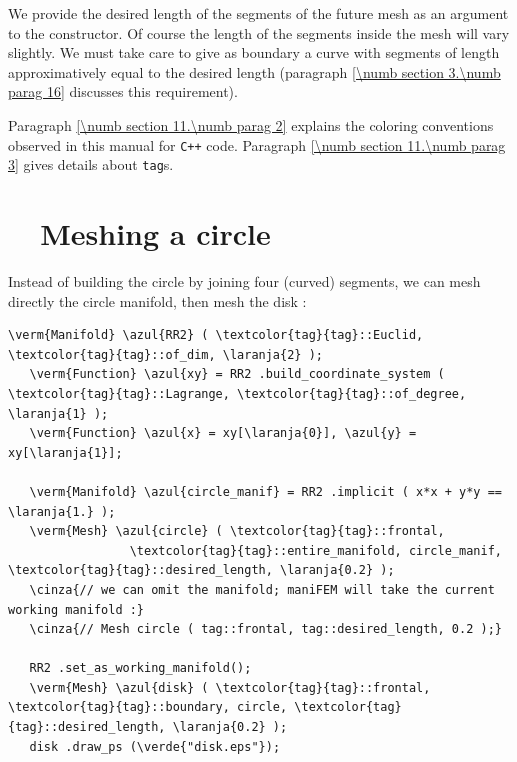We provide the desired length of the segments of the future mesh as an argument to the
constructor.
Of course the length of the segments inside the mesh will vary slightly.
We must take care to give as boundary a curve with segments of length approximatively equal
to the desired length (paragraph \ref{\numb section 3.\numb parag 16} discusses
this requirement).

Paragraph \ref{\numb section 11.\numb parag 2} explains the coloring conventions observed
in this manual for {\tt C++} code.
Paragraph \ref{\numb section 11.\numb parag 3} gives details about {\small\tt\textcolor{tag}{tag}}s.


\section{~~Meshing a circle}\label{\numb section 3.\numb parag 2}

Instead of building the circle by joining four (curved) segments, we can mesh directly
the circle manifold, then mesh the disk :

\begin{Verbatim}[commandchars=\\\{\},formatcom=\small\tt,frame=single,
   label=parag-\ref{\numb section 3.\numb parag 2}.cpp,rulecolor=\color{moldura},
   baselinestretch=0.94,framesep=2mm                                            ]
   \verm{Manifold} \azul{RR2} ( \textcolor{tag}{tag}::Euclid, \textcolor{tag}{tag}::of_dim, \laranja{2} );
   \verm{Function} \azul{xy} = RR2 .build_coordinate_system ( \textcolor{tag}{tag}::Lagrange, \textcolor{tag}{tag}::of_degree, \laranja{1} );
   \verm{Function} \azul{x} = xy[\laranja{0}], \azul{y} = xy[\laranja{1}];
   
   \verm{Manifold} \azul{circle_manif} = RR2 .implicit ( x*x + y*y == \laranja{1.} );
   \verm{Mesh} \azul{circle} ( \textcolor{tag}{tag}::frontal,
                 \textcolor{tag}{tag}::entire_manifold, circle_manif, \textcolor{tag}{tag}::desired_length, \laranja{0.2} );
   \cinza{// we can omit the manifold; maniFEM will take the current working manifold :}
   \cinza{// Mesh circle ( tag::frontal, tag::desired_length, 0.2 );}
   
   RR2 .set_as_working_manifold();
   \verm{Mesh} \azul{disk} ( \textcolor{tag}{tag}::frontal, \textcolor{tag}{tag}::boundary, circle, \textcolor{tag}{tag}::desired_length, \laranja{0.2} );
   disk .draw_ps (\verde{"disk.eps"});
\end{Verbatim}

